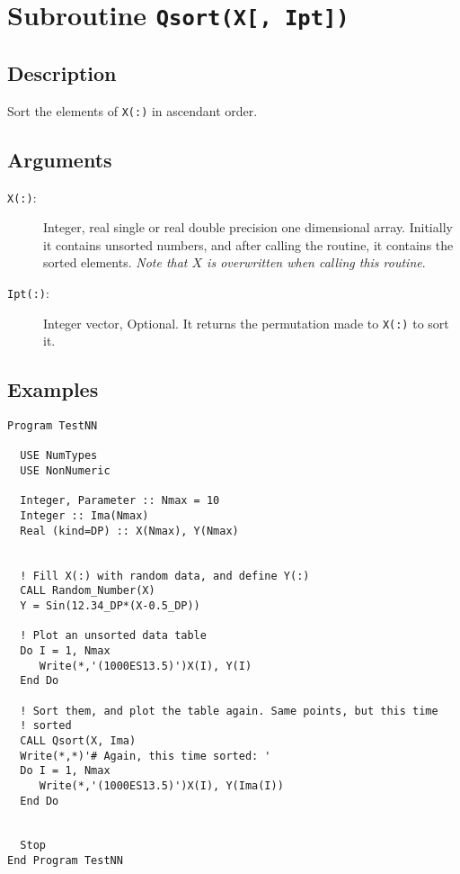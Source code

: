\section{Subroutine \texttt{Qsort(X[, Ipt])}}

\subsection{Description}

Sort the elements of \texttt{X(:)} in ascendant order.

\subsection{Arguments}

\begin{description}
\item[\texttt{X(:)}: ] Integer, real single or real double precision one
  dimensional array. Initially it contains unsorted numbers, and after
  calling the routine, it contains the sorted elements. \emph{Note that
    $X$ is overwritten when calling this routine}. 
\item[\texttt{Ipt(:)}: ] Integer vector, Optional. It returns the
  permutation made to \texttt{X(:)} to sort it.
\end{description}

\subsection{Examples}

\begin{lstlisting}[emph=Qsort,
                   emphstyle=\color{blue},
                   frame=trBL,
                   caption=Sorting data.,
                   label=qsort]
Program TestNN

  USE NumTypes
  USE NonNumeric

  Integer, Parameter :: Nmax = 10
  Integer :: Ima(Nmax)
  Real (kind=DP) :: X(Nmax), Y(Nmax)


  ! Fill X(:) with random data, and define Y(:)
  CALL Random_Number(X)
  Y = Sin(12.34_DP*(X-0.5_DP))

  ! Plot an unsorted data table
  Do I = 1, Nmax
     Write(*,'(1000ES13.5)')X(I), Y(I)
  End Do

  ! Sort them, and plot the table again. Same points, but this time
  ! sorted 
  CALL Qsort(X, Ima)
  Write(*,*)'# Again, this time sorted: '
  Do I = 1, Nmax
     Write(*,'(1000ES13.5)')X(I), Y(Ima(I))
  End Do


  Stop
End Program TestNN
\end{lstlisting}


